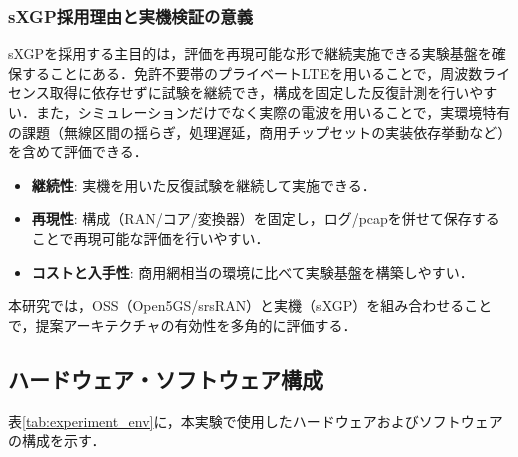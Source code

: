 \subsubsection{sXGP採用理由と実機検証の意義}
sXGPを採用する主目的は，評価を再現可能な形で継続実施できる実験基盤を確保することにある．免許不要帯のプライベートLTEを用いることで，周波数ライセンス取得に依存せずに試験を継続でき，構成を固定した反復計測を行いやすい．また，シミュレーションだけでなく実際の電波を用いることで，実環境特有の課題（無線区間の揺らぎ，処理遅延，商用チップセットの実装依存挙動など）を含めて評価できる．
\begin{itemize}
    \item \textbf{継続性}: 実機を用いた反復試験を継続して実施できる．
    \item \textbf{再現性}: 構成（RAN/コア/変換器）を固定し，ログ/pcapを併せて保存することで再現可能な評価を行いやすい．
    \item \textbf{コストと入手性}: 商用網相当の環境に比べて実験基盤を構築しやすい．
\end{itemize}
本研究では，OSS（Open5GS/srsRAN）と実機（sXGP）を組み合わせることで，提案アーキテクチャの有効性を多角的に評価する．

\subsection{ハードウェア・ソフトウェア構成}
表\ref{tab:experiment_env}に，本実験で使用したハードウェアおよびソフトウェアの構成を示す．

